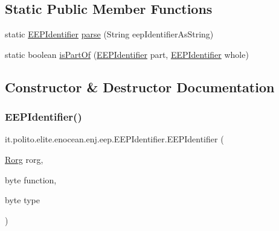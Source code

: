 \subsection*{Static Public Member Functions}
\begin{DoxyCompactItemize}
\item 
static \hyperlink{classit_1_1polito_1_1elite_1_1enocean_1_1enj_1_1eep_1_1_e_e_p_identifier}{E\+E\+P\+Identifier} \hyperlink{classit_1_1polito_1_1elite_1_1enocean_1_1enj_1_1eep_1_1_e_e_p_identifier_aa5eedbee35b69679a1a74d0838bf270d}{parse} (String eep\+Identifier\+As\+String)
\item 
static boolean \hyperlink{classit_1_1polito_1_1elite_1_1enocean_1_1enj_1_1eep_1_1_e_e_p_identifier_a91f2572493320ed6116cfe95b01258ef}{is\+Part\+Of} (\hyperlink{classit_1_1polito_1_1elite_1_1enocean_1_1enj_1_1eep_1_1_e_e_p_identifier}{E\+E\+P\+Identifier} part, \hyperlink{classit_1_1polito_1_1elite_1_1enocean_1_1enj_1_1eep_1_1_e_e_p_identifier}{E\+E\+P\+Identifier} whole)
\end{DoxyCompactItemize}


\subsection{Constructor \& Destructor Documentation}
\hypertarget{classit_1_1polito_1_1elite_1_1enocean_1_1enj_1_1eep_1_1_e_e_p_identifier_ad3e85d7b90baf171d99bc0442a4b7c65}{}\label{classit_1_1polito_1_1elite_1_1enocean_1_1enj_1_1eep_1_1_e_e_p_identifier_ad3e85d7b90baf171d99bc0442a4b7c65} 
\subsubsection{\texorpdfstring{E\+E\+P\+Identifier()}{EEPIdentifier()}}
{\footnotesize\ttfamily it.\+polito.\+elite.\+enocean.\+enj.\+eep.\+E\+E\+P\+Identifier.\+E\+E\+P\+Identifier (\begin{DoxyParamCaption}\item[{\hyperlink{classit_1_1polito_1_1elite_1_1enocean_1_1enj_1_1eep_1_1_rorg}{Rorg}}]{rorg,  }\item[{byte}]{function,  }\item[{byte}]{type }\end{DoxyParamCaption})}

